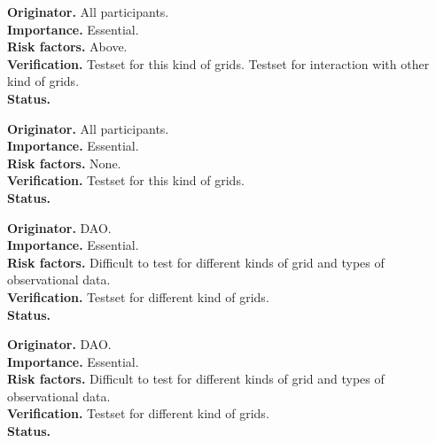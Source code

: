 

\begin{reqlist}
{\bf Originator.} All participants. \\
{\bf Importance.} Essential. \\
{\bf Risk factors.} Above. \\
{\bf Verification.} Testset for this kind of grids. Testset for interaction 
with other kind of grids. \\
{\bf Status.} 
\end{reqlist}



\begin{reqlist}
{\bf Originator.} All participants. \\
{\bf Importance.} Essential. \\
{\bf Risk factors.} None. \\
{\bf Verification.} Testset for this kind of grids. \\
{\bf Status.} 
\end{reqlist}




\begin{reqlist}
{\bf Originator.} DAO. \\
{\bf Importance.} Essential. \\
{\bf Risk factors.} Difficult to test for different kinds of grid and types 
of observational data. \\
{\bf Verification.} Testset for different kind of grids. \\
{\bf Status.} 
\end{reqlist}



\begin{reqlist}
{\bf Originator.} DAO. \\
{\bf Importance.} Essential. \\
{\bf Risk factors.} Difficult to test for different kinds of grid and types 
of observational data. \\
{\bf Verification.} Testset for different kind of grids. \\
{\bf Status.} 
\end{reqlist}


